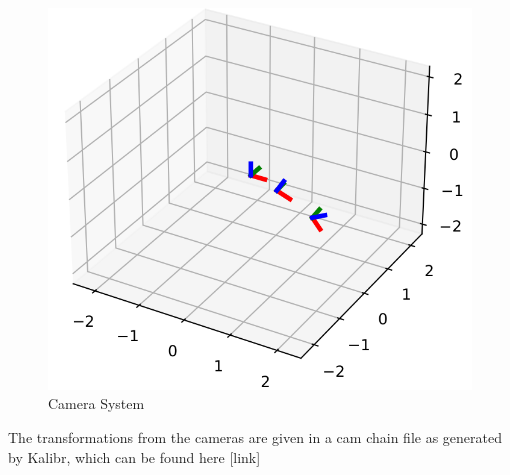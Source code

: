 \documentclass{article}
\begin{document}
\begin{figure}[h]
    \centering
    \includegraphics[scale=0.5]{CamSys.png}
    \caption{Camera System}
\end{figure}

The transformations from the cameras are given in a cam chain file as generated by Kalibr, which can be found here [link]
\end{document}
